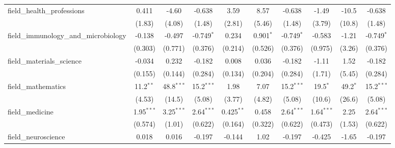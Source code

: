 \begin{tabular}{lccccccccc}
   field\_health\_professions                                  & 0.411          & -4.60          & -0.638         & 3.59          & 8.57           & -0.638         & -1.49         & -10.5        & -0.638\\   
                                                               & (1.83)         & (4.08)         & (1.48)         & (2.81)        & (5.46)         & (1.48)         & (3.79)        & (10.8)       & (1.48)\\   
   field\_immunology\_and\_microbiology                        & -0.138         & -0.497         & -0.749$^{*}$   & 0.234         & 0.901$^{*}$    & -0.749$^{*}$   & -0.583        & -1.21        & -0.749$^{*}$\\   
                                                               & (0.303)        & (0.771)        & (0.376)        & (0.214)       & (0.526)        & (0.376)        & (0.975)       & (3.26)       & (0.376)\\   
   field\_materials\_science                                   & -0.034         & 0.232          & -0.182         & 0.008         & 0.036          & -0.182         & -1.11         & 1.52         & -0.182\\   
                                                               & (0.155)        & (0.144)        & (0.284)        & (0.134)       & (0.204)        & (0.284)        & (1.71)        & (5.45)       & (0.284)\\   
   field\_mathematics                                          & 11.2$^{**}$    & 48.8$^{***}$   & 15.2$^{***}$   & 1.98          & 7.07           & 15.2$^{***}$   & 19.5$^{*}$    & 49.2$^{*}$   & 15.2$^{***}$\\   
                                                               & (4.53)         & (14.5)         & (5.08)         & (3.77)        & (4.82)         & (5.08)         & (10.6)        & (26.6)       & (5.08)\\   
   field\_medicine                                             & 1.95$^{***}$   & 3.25$^{***}$   & 2.64$^{***}$   & 0.425$^{**}$  & 0.458          & 2.64$^{***}$   & 1.64$^{***}$  & 2.25         & 2.64$^{***}$\\   
                                                               & (0.574)        & (1.01)         & (0.622)        & (0.164)       & (0.322)        & (0.622)        & (0.473)       & (1.53)       & (0.622)\\   
   field\_neuroscience                                         & 0.018          & 0.016          & -0.197         & -0.144        & 1.02           & -0.197         & -0.425        & -1.65        & -0.197\\   

\end{tabular}
